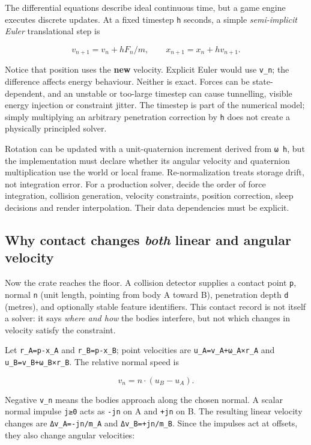The differential equations describe ideal continuous time, but a game engine executes discrete updates. At a fixed timestep \texttt{h} seconds, a simple \emph{semi-implicit Euler} translational step is

\[
v_{n+1}=v_n+h F_n/m,\qquad x_{n+1}=x_n+h v_{n+1}.
\]

Notice that position uses the \textbf{new} velocity. Explicit Euler would use \texttt{v\_n}; the difference affects energy behaviour. Neither is exact. Forces can be state-dependent, and an unstable or too-large timestep can cause tunnelling, visible energy injection or constraint jitter. The timestep is part of the numerical model; simply multiplying an arbitrary penetration correction by \texttt{h} does not create a physically principled solver.

Rotation can be updated with a unit-quaternion increment derived from \texttt{ω\ h}, but the implementation must declare whether its angular velocity and quaternion multiplication use the world or local frame. Re-normalization treats storage drift, not integration error. For a production solver, decide the order of force integration, collision generation, velocity constraints, position correction, sleep decisions and render interpolation. Their data dependencies must be explicit.

\subsection{\texorpdfstring{Why contact changes \emph{both} linear and angular velocity}{Why contact changes both linear and angular velocity}}\label{02-foundations-ii-ch039-why-contact-changes-both-linear-and-angular-velocity}

Now the crate reaches the floor. A collision detector supplies a contact point \texttt{p}, normal \texttt{n} (unit length, pointing from body A toward B), penetration depth \texttt{d} (metres), and optionally stable feature identifiers. This contact record is not itself a solver: it says \emph{where and how} the bodies interfere, but not which changes in velocity satisfy the constraint.

Let \texttt{r\_A=p-x\_A} and \texttt{r\_B=p-x\_B}; point velocities are \texttt{u\_A=v\_A+ω\_A×r\_A} and \texttt{u\_B=v\_B+ω\_B×r\_B}. The relative normal speed is

\[
v_n=n\cdot(u_B-u_A).
\]

Negative \texttt{v\_n} means the bodies approach along the chosen normal. A scalar normal impulse \texttt{j≥0} acts as \texttt{-jn} on A and \texttt{+jn} on B. The resulting linear velocity changes are \texttt{Δv\_A=-jn/m\_A} and \texttt{Δv\_B=+jn/m\_B}. Since the impulses act at offsets, they also change angular velocities:

